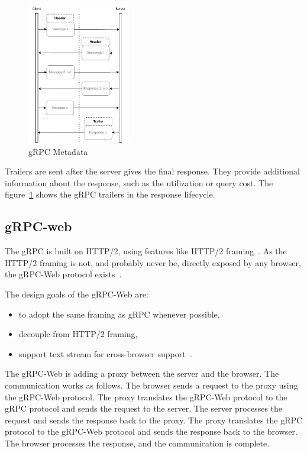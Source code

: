 \begin{figure}[hbt!]
    \centering
    \captionsetup{justification=centering}
    \includegraphics[width=0.4\textwidth]{images/grpc-metadata}
    \caption{gRPC Metadata}
    \label{fig:grpc-metadata}
\end{figure}

Trailers are sent after the server gives the final response.
They provide additional information about the response, such as the utilization or query cost.
The figure~\ref{fig:grpc-metadata} shows the gRPC trailers in the response lifecycle.

\cite{grpc-metadata}

\subsection{gRPC-web}
The gRPC is built on HTTP/2, using features like HTTP/2 framing~\cite{grpc-protocol-http2}.
As the HTTP/2 framing is not, and probably never be, directly exposed by any browser, the gRPC-Web protocol exists~\cite{grpc-protocol-web}.

The design goals of the gRPC-Web are:
\begin{itemize}
    \item to adopt the same framing as gRPC whenever possible,
    \item decouple from HTTP/2 framing,
    \item support text stream for cross-browser support~\cite{grpc-protocol-web}.
\end{itemize}

The gRPC-Web is adding a proxy between the server and the browser.
The communication works as follows.
The browser sends a request to the proxy using the gRPC-Web protocol.
The proxy translates the gRPC-Web protocol to the gRPC protocol and sends the request to the server.
The server processes the request and sends the response back to the proxy.
The proxy translates the gRPC protocol to the gRPC-Web protocol and sends the response back to the browser.
The browser processes the response, and the communication is complete.
\cite{grpc-protocol-web}

